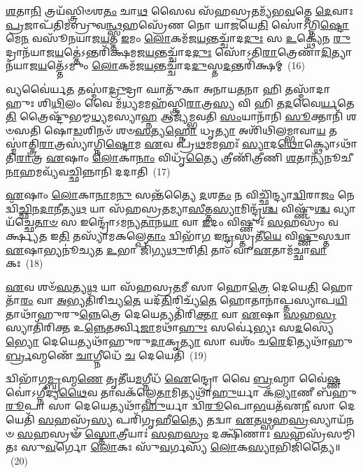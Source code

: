 \-\ul{𑌶}\-𑌤𑌾\-\ul{𑌨𑌿} 𑌤𑍍𑌰𑌯᳴𑌸𑍍𑌤𑍍𑌰𑌿𑍞𑌶\-\ul{𑌤𑌂} 𑌚𑌾\-\ul{𑌥} 𑌸𑍈𑌵 𑌸᳴𑌹𑌸𑍍𑌰\-\ul{𑌤}\-𑌮𑍍𑌯᳴𑌭\-\ul{𑌵}\-𑌤𑍍𑌤𑍇 \ul{𑌦𑍇}\-𑌵𑌾𑌃 \ul{𑌪𑍍𑌰}\-𑌜𑌾𑌪᳴𑌤𑌿𑌮𑌬𑍍𑌰𑍁𑌵\-\ul{𑌨𑍍𑌥𑍍𑌸}\-𑌹𑌸𑍍𑌰𑍇᳴𑌣 𑌨𑍋 𑌯𑌾\-\ul{𑌜}\-𑌯𑍇\-\ul{𑌤𑌿} 𑌸𑍋॑\-𑌽𑌗𑍍𑌨𑌿\-\ul{𑌷𑍍𑌟𑍋}\-𑌮𑍇\-\ul{𑌨} 𑌵𑌸𑍂᳴𑌨𑌯𑌾𑌜\-\ul{𑌯}\-𑌤𑍍𑌤 \ul{𑌇}\-𑌮𑌂 \ul{𑌲𑍋}\-𑌕𑌮᳴𑌜\-\ul{𑌯}\-𑌨𑍍𑌤𑌚𑍍𑌚𑌾᳴𑌦\-\ul{𑌦𑍁𑌃} 𑌸 \ul{𑌉}\-𑌕𑍍𑌥𑍍𑌯𑍇᳴𑌨 \ul{𑌰𑍁}\-𑌦𑍍𑌰𑌾𑌨᳴𑌯𑌾𑌜\-\ul{𑌯}\-𑌤𑍍𑌤𑍇॑\-𑌽𑌨𑍍𑌤𑌰𑌿᳴𑌕𑍍𑌷𑌮𑌜\-\ul{𑌯}\-𑌨𑍍𑌤𑌚𑍍𑌚𑌾᳴𑌦\-\ul{𑌦𑍁𑌃} 𑌸𑍋᳴\-𑌽𑌤𑌿\-\ul{𑌰𑌾}\-𑌤𑍍𑌰𑍇𑌣𑌾᳴\-\-\ul{𑌦𑌿}\-𑌤𑍍𑌯𑌾𑌨᳴𑌯𑌾𑌜\-\ul{𑌯}\-𑌤𑍍𑌤𑍇᳴\-𑌽𑌮𑍁𑌂 \ul{𑌲𑍋}\-𑌕𑌮᳴𑌜\-\ul{𑌯}\-𑌨𑍍𑌤𑌚𑍍𑌚𑌾᳴𑌦\-\ul{𑌦𑍁}\-𑌸𑍍𑌤\-\ul{𑌦}\-𑌨𑍍𑌤𑌰𑌿᳴𑌕𑍍𑌷𑌮𑍍~(16)

𑌵𑍍𑌯𑌵𑍈॑𑌰𑍍𑌯\-\ul{𑌤} 𑌤𑌸𑍍𑌮𑌾॑\-\ul{𑌦𑍍𑌰𑍁}\-𑌦𑍍𑌰𑌾 𑌘𑌾𑌤𑍁᳴𑌕𑌾 𑌅𑌨𑌾𑌯\-\ul{𑌤}\-𑌨𑌾 𑌹𑌿 𑌤𑌸𑍍𑌮𑌾᳴𑌦𑌾𑌹𑍁𑌃 𑌶𑌿\-\ul{𑌥𑌿}\-𑌲𑌂 𑌵𑍈 𑌮᳴\-\ul{𑌧𑍍𑌯}\-𑌮𑌮𑌹᳴𑌸𑍍𑌤𑍍𑌰𑌿\-\ul{𑌰𑌾}\-𑌤𑍍𑌰\-\ul{𑌸𑍍𑌯} 𑌵𑌿 𑌹𑌿 𑌤\-\ul{𑌦}\-𑌵𑍈\-\ul{𑌰𑍍𑌯}\-𑌤𑍇\-\ul{𑌤𑌿} 𑌤𑍍𑌰𑍈𑌷𑍍𑌟𑍁᳴𑌭𑌮𑍍𑌮\-\ul{𑌧𑍍𑌯}\-𑌮𑌸𑍍𑌯𑌾\-\ul{𑌹𑍍𑌨} 𑌆𑌜𑍍𑌯᳴𑌮𑍍𑌭𑌵𑌤𑌿 \ul{𑌸𑌂}\-𑌯𑌾𑌨𑌾᳴𑌨𑌿 \ul{𑌸𑍂}\-𑌕𑍍𑌤𑌾𑌨𑌿᳴ 𑌶𑍞𑌸𑌤𑌿 𑌷𑍋\-\ul{𑌡}\-𑌶𑌿𑌨𑍞᳴ 𑌶𑍞\-\ul{𑌸}\-𑌤𑍍𑌯\-\ul{𑌹𑍍𑌨𑍋} 𑌧𑍃\-\ul{𑌤𑍍𑌯𑌾} 𑌅𑌶𑌿᳴𑌥𑌿𑌲𑌮𑍍𑌭𑌾𑌵𑌾\-\ul{𑌯} 𑌤𑌸𑍍𑌮𑌾॑𑌤𑍍𑌤𑍍𑌰𑌿\-\ul{𑌰𑌾}\-𑌤𑍍𑌰𑌸𑍍𑌯𑌾॑𑌗𑍍𑌨𑌿\-\ul{𑌷𑍍𑌟𑍋}\-𑌮 \ul{𑌏}\-𑌵 𑌪𑍍𑌰᳴\-\ul{𑌥}\-𑌮𑌮𑌹𑌃᳴ \ul{𑌸𑍍𑌯𑌾}\-𑌦\-\ul{𑌥𑍋}\-𑌕𑍍𑌥𑍍𑌯𑍋\-𑌽𑌥𑌾᳴𑌤𑌿\-\ul{𑌰𑌾}\-𑌤𑍍𑌰 \ul{𑌏}\-𑌷𑌾𑌂 \ul{𑌲𑍋}\-𑌕𑌾\-\ul{𑌨𑌾𑌂} 𑌵𑌿𑌧𑍃᳴\-\ul{𑌤𑍍𑌯𑍈} 𑌤𑍍𑌰𑍀𑌣𑌿᳴𑌤𑍍𑌰𑍀𑌣𑌿 \ul{𑌶}\-𑌤𑌾𑌨𑍍𑌯᳴𑌨𑍂𑌚𑍀\-\ul{𑌨𑌾}\-𑌹𑌮𑌵𑍍𑌯᳴𑌵𑌚𑍍𑌛𑌿𑌨𑍍𑌨𑌾𑌨𑌿 𑌦𑌦𑌾𑌤𑌿~(17)

\-\ul{𑌏}\-𑌷𑌾𑌂 \ul{𑌲𑍋}\-𑌕𑌾\-\ul{𑌨𑌾}\-𑌮\-\ul{𑌨𑍁} 𑌸𑌨𑍍𑌤᳴𑌤𑍍𑌯𑍈 \ul{𑌦}\-𑌶\-\ul{𑌤𑌂} 𑌨 𑌵𑌿𑌚𑍍𑌛𑌿᳴𑌨𑍍𑌦𑍍𑌯𑌾\-\ul{𑌦𑍍𑌵𑌿}\-𑌰𑌾\-\ul{𑌜𑌂} 𑌨𑍇𑌦𑍍𑌵𑌿᳴\-\ul{𑌚𑍍𑌛𑌿}\-𑌨\-\ul{𑌦𑌾}\-𑌨𑍀𑌤𑍍𑌯\-\ul{𑌥} 𑌯𑌾 𑌸᳴𑌹𑌸𑍍𑌰\-\ul{𑌤}\-𑌮𑍍𑌯𑌾\-\ul{𑌸𑍀}\-𑌤𑍍𑌤\-\ul{𑌸𑍍𑌯𑌾}\-𑌮𑌿𑌨𑍍𑌦𑍍𑌰᳴\-\ul{𑌶𑍍𑌚} 𑌵𑌿𑌷𑍍𑌣𑍁᳴\-\ul{𑌶𑍍𑌚} 𑌵𑍍𑌯𑌾𑌯᳴𑌚𑍍𑌛𑍇\-\ul{𑌤𑌾}\-\-\ul{𑍞} 𑌸 𑌇𑌨𑍍𑌦𑍍𑌰𑍋᳴\-𑌽𑌮𑌨𑍍𑌯\-\ul{𑌤𑌾}\-𑌨\-\ul{𑌯𑌾} 𑌵𑌾 \ul{𑌇}\-𑌦𑌂 𑌵𑌿𑌷𑍍𑌣𑍁𑌃᳴ \ul{𑌸}\-𑌹𑌸𑍍𑌰𑌂᳴ 𑌵𑌰𑍍𑌕𑍍𑌷𑍍𑌯\-\ul{𑌤} 𑌇\-\ul{𑌤𑌿} 𑌤𑌸𑍍𑌯𑌾᳴𑌮𑌕𑌲𑍍𑌪𑍇\-\ul{𑌤𑌾𑌂} 𑌦𑍍𑌵𑌿𑌭𑌾᳴\-\ul{𑌗} 𑌇\-\ul{𑌨𑍍𑌦𑍍𑌰}\-𑌸𑍍𑌤𑍃𑌤𑍀᳴\-\ul{𑌯𑍇} 𑌵𑌿\-\ul{𑌷𑍍𑌣𑍁}\-𑌸𑍍𑌤𑌦𑍍𑌵𑌾 \ul{𑌏}\-𑌷𑌾𑌭𑍍𑌯𑌨𑍂॑𑌚𑍍𑌯𑌤 \ul{𑌉}\-𑌭𑌾 𑌜𑌿᳴𑌗𑍍𑌯\-\ul{𑌥𑍁}\-𑌰𑌿\-\ul{𑌤𑌿} 𑌤𑌾𑌂 𑌵𑌾 \ul{𑌏}\-𑌤𑌾𑌮᳴𑌚𑍍𑌛𑌾\-\ul{𑌵𑌾}\-𑌕𑌃~(18)

\-\ul{𑌏}\-𑌵 𑌶𑍞᳴\-\ul{𑌸}\-𑌤𑍍𑌯\-\ul{𑌥} 𑌯𑌾 𑌸᳴𑌹𑌸𑍍𑌰\-\ul{𑌤}\-𑌮𑍀 𑌸𑌾 𑌹𑍋\-\ul{𑌤𑍍𑌰𑍇} 𑌦𑍇𑌯𑍇\-\ul{𑌤𑌿} 𑌹𑍋𑌤𑌾᳴\-\ul{𑌰𑌂} 𑌵𑌾 \ul{𑌅}\-𑌭𑍍𑌯𑌤𑌿᳴𑌰𑌿𑌚𑍍𑌯\-\ul{𑌤𑍇} 𑌯𑌦᳴\-\ul{𑌤𑌿}\-𑌰𑌿𑌚𑍍𑌯᳴\-\ul{𑌤𑍇} 𑌹𑍋𑌤𑌾𑌨𑌾॑𑌪𑍍𑌤𑌸𑍍𑌯𑌾𑌪\-\ul{𑌯𑌿}\-𑌤𑌾\-𑌥𑌾᳴𑌹𑍁𑌰𑍁\-\ul{𑌨𑍍𑌨𑍇}\-𑌤𑍍𑌰𑍇 𑌦𑍇𑌯𑍇𑌤𑍍𑌯𑌤𑌿᳴𑌰𑌿\-\ul{𑌕𑍍𑌤𑌾} 𑌵𑌾 \ul{𑌏}\-𑌷𑌾 \ul{𑌸}\-𑌹\-\ul{𑌸𑍍𑌰}\-𑌸𑍍𑌯𑌾𑌤𑌿᳴𑌰𑌿𑌕𑍍𑌤 𑌉\-\ul{𑌨𑍍𑌨𑍇}\-𑌤𑌰𑍍𑌤𑍍𑌵𑌿\-\ul{𑌜𑌾}\-𑌮𑌥𑌾᳴\-\ul{𑌹𑍁𑌃} 𑌸𑌰𑍍𑌵𑍇॑𑌭𑍍𑌯𑌃 𑌸\-\ul{𑌦}\-𑌸𑍍𑌯𑍇॑\-\ul{𑌭𑍍𑌯𑍋} 𑌦𑍇𑌯𑍇𑌤𑍍𑌯𑌥𑌾᳴𑌹𑍁𑌰𑍁\-\ul{𑌦𑌾}\-𑌕𑍃\-\ul{𑌤𑍍𑌯𑌾} 𑌸𑌾 𑌵𑌶𑌂᳴ 𑌚\-\ul{𑌰𑍇}\-𑌦𑌿𑌤𑍍𑌯𑌥𑌾᳴𑌹𑍁\-\ul{𑌰𑍍𑌬𑍍𑌰}\-𑌹𑍍𑌮𑌣𑍇᳴ \ul{𑌚𑌾}\-𑌗𑍍𑌨𑍀𑌧𑍇᳴ \ul{𑌚} 𑌦𑍇𑌯𑍇𑌤𑌿᳴~(19)

𑌦𑍍𑌵𑌿𑌭𑌾᳴𑌗\-\ul{𑌮𑍍𑌬𑍍𑌰}\-𑌹𑍍𑌮\-\ul{𑌣𑍇} 𑌤𑍃𑌤𑍀᳴𑌯\-\ul{𑌮}\-𑌗𑍍𑌨𑍀𑌧᳴ \ul{𑌐}\-𑌨𑍍𑌦𑍍𑌰𑍋 𑌵𑍈 \ul{𑌬𑍍𑌰}\-𑌹𑍍𑌮𑌾 𑌵𑍈॑\-\ul{𑌷𑍍𑌣}\-𑌵𑍋॑\-𑌽𑌗𑍍𑌨𑍀𑌦𑍍𑌯\-\ul{𑌥𑍈}\-𑌵 𑌤𑌾𑌵𑌕᳴𑌲𑍍𑌪𑍇\-\ul{𑌤𑌾}\-𑌮𑌿𑌤𑍍𑌯𑌥𑌾᳴\-\ul{𑌹𑍁}\-𑌰𑍍𑌯𑌾 𑌕᳴\-\ul{𑌲𑍍𑌯𑌾}\-𑌣𑍀 𑌬᳴𑌹𑍁\-\ul{𑌰𑍂}\-𑌪𑌾 𑌸𑌾 𑌦𑍇𑌯𑍇𑌤𑍍𑌯𑌥𑌾᳴\-\ul{𑌹𑍁}\-𑌰𑍍𑌯𑌾 𑌦𑍍𑌵𑌿᳴\-\ul{𑌰𑍂}\-𑌪𑍋\-\ul{𑌭}\-𑌯𑌤᳴𑌏\-\ul{𑌨𑍀} 𑌸𑌾 𑌦𑍇𑌯𑍇𑌤𑌿᳴ \ul{𑌸}\-𑌹𑌸𑍍𑌰᳴\-\ul{𑌸𑍍𑌯} 𑌪𑌰𑌿᳴𑌗𑍃𑌹𑍀\-\ul{𑌤𑍍𑌯𑍈} 𑌤𑌦𑍍𑌵𑌾 \ul{𑌏}\-𑌤\-\ul{𑌥𑍍𑌸}\-𑌹\-\ul{𑌸𑍍𑌰}\-𑌸𑍍𑌯𑌾𑌯᳴𑌨𑍞 \ul{𑌸}\-𑌹𑌸𑍍𑌰𑍟᳴ \ul{𑌸𑍍𑌤𑍋}\-𑌤𑍍𑌰𑍀𑌯𑌾𑌃॑ \ul{𑌸}\-𑌹\-\ul{𑌸𑍍𑌰𑌂} 𑌦𑌕𑍍𑌷𑌿᳴𑌣𑌾𑌃 \ul{𑌸}\-𑌹𑌸𑍍𑌰᳴𑌸𑌮𑍍𑌮𑌿𑌤𑌃 𑌸𑍁\-\ul{𑌵}\-𑌰𑍍𑌗𑍋 \ul{𑌲𑍋}\-𑌕𑌃 𑌸𑍁᳴\-\ul{𑌵}\-𑌰𑍍𑌗𑌸𑍍𑌯᳴ \ul{𑌲𑍋}\-𑌕\-\ul{𑌸𑍍𑌯𑌾}\-𑌭𑌿𑌜𑌿᳴𑌤𑍍𑌯𑍈॥~(20)

